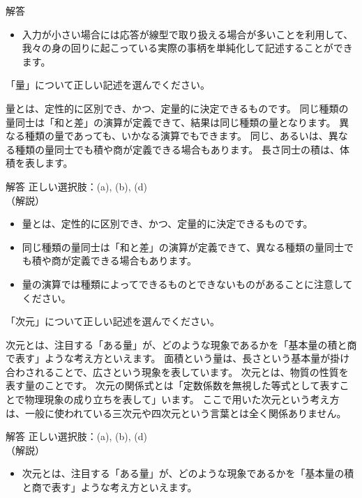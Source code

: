 \documentclass[uplatex,dvipdfmx,a4paper,11pt]{jsarticle}
\begin{document}
\begin{qlist}
\begin{itembox}[l]{解答}
\begin{itemize}
          \item 入力が小さい場合には応答が線型で取り扱える場合が多いことを利用して、我々の身の回りに起こっている実際の事柄を単純化して記述することができます。
        \end{itemize}
    \end{itembox}
	\qitem 「量」について正しい記述を選んでください。
		\begin{qlist2}
			\qitem 量とは、定性的に区別でき、かつ、定量的に決定できるものです。
			\qitem 同じ種類の量同士は「和と差」の演算が定義できて、結果は同じ種類の量となります。
			\qitem 異なる種類の量であっても、いかなる演算でもできます。
			\qitem 同じ、あるいは、異なる種類の量同士でも積や商が定義できる場合もあります。
			\qitem 長さ同士の積は、体積を表します。
    \end{qlist2}
    \vspace{3mm}
    \begin{itembox}[l]{解答}
        正しい選択肢：(a), (b), (d)\\
        （解説）
        \begin{itemize}
          \item 量とは、定性的に区別でき、かつ、定量的に決定できるものです。
          \item 同じ種類の量同士は「和と差」の演算が定義できて、異なる種類の量同士でも積や商が定義できる場合もあります。
          \item 量の演算では種類によってできるものとできないものがあることに注意してください。
        \end{itemize}
    \end{itembox}
	\qitem 「次元」について正しい記述を選んでください。
		\begin{qlist2}
			\qitem 次元とは、注目する「ある量」が、どのような現象であるかを「基本量の積と商で表す」ような考え方といえます。
			\qitem 面積という量は、長さという基本量が掛け合わされることで、広さという現象を表しています。
			\qitem 次元とは、物質の性質を表す量のことです。
			\qitem 次元の関係式とは「定数係数を無視した等式として表すことで物理現象の成り立ちを表して」います。
			\qitem ここで用いた次元という考え方は、一般に使われている三次元や四次元という言葉とは全く関係ありません。
		\end{qlist2}
    \vspace{3mm}
    \begin{itembox}[l]{解答}
        正しい選択肢：(a), (b), (d)\\
        （解説）
        \begin{itemize}
          \item 次元とは、注目する「ある量」が、どのような現象であるかを「基本量の積と商で表す」ような考え方といえます。

\end{itemize}
\end{itembox}
\end{qlist}
\end{document}
